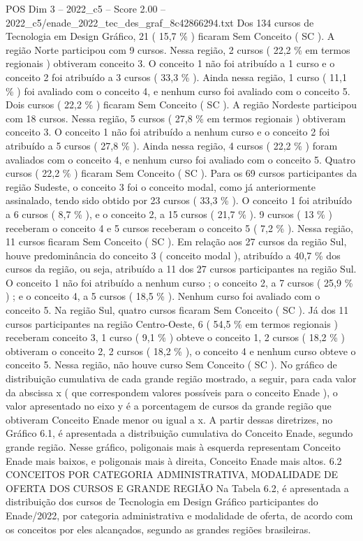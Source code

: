 \begin{textsample}{POS Dim 3 – 2022\_c5 – Score 2.00 – 2022\_c5/enade\_2022\_tec\_des\_graf\_8c42866294.txt}
Dos 134 cursos de Tecnologia em Design Gráfico, 21 ( 15,7 \% ) ficaram Sem Conceito ( SC ).
A região Norte participou com 9 cursos.
Nessa região, 2 cursos ( 22,2 \% em termos regionais ) obtiveram conceito 3.
O conceito 1 não foi atribuído a 1 curso e o conceito 2 foi atribuído a 3 cursos ( 33,3 \% ).
Ainda nessa região, 1 curso ( 11,1 \% ) foi avaliado com o conceito 4, e nenhum curso foi avaliado com o conceito 5.
Dois cursos ( 22,2 \% ) ficaram Sem Conceito ( SC ).
A região Nordeste participou com 18 cursos.
Nessa região, 5 cursos ( 27,8 \% em termos regionais ) obtiveram conceito 3.
O conceito 1 não foi atribuído a nenhum curso e o conceito 2 foi atribuído a 5 cursos ( 27,8 \% ).
Ainda nessa região, 4 cursos ( 22,2 \% ) foram avaliados com o conceito 4, e nenhum curso foi avaliado com o conceito 5.
Quatro cursos ( 22,2 \% ) ficaram Sem Conceito ( SC ).
Para os 69 cursos participantes da região Sudeste, o conceito 3 foi o conceito modal, como já anteriormente assinalado, tendo sido obtido por 23 cursos ( 33,3 \% ).
O conceito 1 foi atribuído a 6 cursos ( 8,7 \% ), e o conceito 2, a 15 cursos ( 21,7 \% ). 9 cursos ( 13 \% ) receberam o conceito 4 e 5 cursos receberam o conceito 5 ( 7,2 \% ).
Nessa região, 11 cursos ficaram Sem Conceito ( SC ).
Em relação aos 27 cursos da região Sul, houve predominância do conceito 3 ( conceito modal ), atribuído a 40,7 \% dos cursos da região, ou seja, atribuído a 11 dos 27 cursos participantes na região Sul.
O conceito 1 não foi atribuído a nenhum curso ; o conceito 2, a 7 cursos ( 25,9 \% ) ; e o conceito 4, a 5 cursos ( 18,5 \% ).
Nenhum curso foi avaliado com o conceito 5.
Na região Sul, quatro cursos ficaram Sem Conceito ( SC ).
Já dos 11 cursos participantes na região Centro-Oeste, 6 ( 54,5 \% em termos regionais ) receberam conceito 3, 1 curso ( 9,1 \% ) obteve o conceito 1, 2 cursos ( 18,2 \% ) obtiveram o conceito 2, 2 cursos ( 18,2 \% ), o conceito 4 e nenhum curso obteve o conceito 5.
Nessa região, não houve curso Sem Conceito ( SC ).
No gráfico de distribuição cumulativa de cada grande região mostrado, a seguir, para cada valor da abscissa x ( que correspondem valores possíveis para o conceito Enade ), o valor apresentado no eixo y é a porcentagem de cursos da grande região que obtiveram Conceito Enade menor ou igual a x.
A partir dessas diretrizes, no Gráfico 6.1, é apresentada a distribuição cumulativa do Conceito Enade, segundo grande região.
Nesse gráfico, poligonais mais à esquerda representam Conceito Enade mais baixos, e poligonais mais à direita, Conceito Enade mais altos. 6.2 CONCEITOS POR CATEGORIA ADMINISTRATIVA, MODALIDADE DE OFERTA DOS CURSOS E GRANDE REGIÃO Na Tabela 6.2, é apresentada a distribuição dos cursos de Tecnologia em Design Gráfico participantes do Enade/2022, por categoria administrativa e modalidade de oferta, de acordo com os conceitos por eles alcançados, segundo as grandes regiões brasileiras.

\end{textsample}
